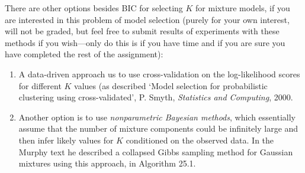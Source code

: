 \documentclass[11pt,psfig]{article}
\begin{document}
There are other options besides BIC for selecting $K$ for mixture models, if  you are interested in this problem of model selection
(purely for your own interest, will not be graded, but feel free to submit results of experiments with these methods if you wish---only do this is if you have time and if you are sure you have completed the rest of the assignment):
\begin{enumerate}
\item A data-driven approach us to use cross-validation
on the log-likelihood scores for different $K$ values (as described `Model selection for probabilistic clustering using cross-validated', P. Smyth, {\it Statistics and Computing}, 2000. 
\item Another option is to use {\it nonparametric Bayesian methods}, which essentially assume that the number of mixture components could be infinitely large and then infer likely values for  $K$ conditioned on the observed data. In the Murphy text he described a collapsed Gibbs sampling method for Gaussian mixtures using this approach, in Algorithm 25.1.
\end{enumerate}



%
%
%
%
\end{document}

